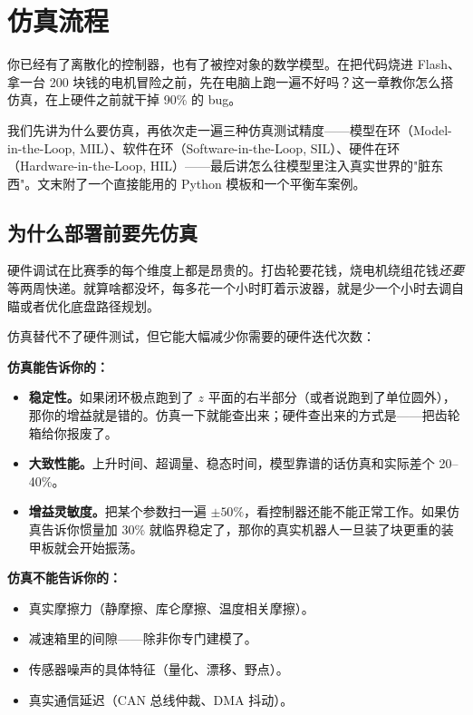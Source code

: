 \section{仿真流程}

你已经有了离散化的控制器，也有了被控对象的数学模型。在把代码烧进 Flash、拿一台 200 块钱的电机冒险之前，先在电脑上跑一遍不好吗？这一章教你怎么搭仿真，在上硬件之前就干掉 90\% 的 bug。

我们先讲为什么要仿真，再依次走一遍三种仿真测试精度——模型在环（Model-in-the-Loop, MIL）、软件在环（Software-in-the-Loop, SIL）、硬件在环（Hardware-in-the-Loop, HIL）——最后讲怎么往模型里注入真实世界的"脏东西"。文末附了一个直接能用的 Python 模板和一个平衡车案例。

\subsection{为什么部署前要先仿真}

硬件调试在比赛季的每个维度上都是昂贵的。打齿轮要花钱，烧电机绕组花钱\textit{还要}等两周快递。就算啥都没坏，每多花一个小时盯着示波器，就是少一个小时去调自瞄或者优化底盘路径规划。

仿真替代不了硬件测试，但它能大幅减少你需要的硬件迭代次数：

\textbf{仿真能告诉你的：}
\begin{itemize}
    \item \textbf{稳定性。}如果闭环极点跑到了 $z$ 平面的右半部分（或者说跑到了单位圆外），那你的增益就是错的。仿真一下就能查出来；硬件查出来的方式是——把齿轮箱给你报废了。
    \item \textbf{大致性能。}上升时间、超调量、稳态时间，模型靠谱的话仿真和实际差个 20--40\%。
    \item \textbf{增益灵敏度。}把某个参数扫一遍 $\pm 50\%$，看控制器还能不能正常工作。如果仿真告诉你惯量加 30\% 就临界稳定了，那你的真实机器人一旦装了块更重的装甲板就会开始振荡。
\end{itemize}

\textbf{仿真不能告诉你的：}
\begin{itemize}
    \item 真实摩擦力（静摩擦、库仑摩擦、温度相关摩擦）。
    \item 减速箱里的间隙——除非你专门建模了。
    \item 传感器噪声的具体特征（量化、漂移、野点）。
    \item 真实通信延迟（CAN 总线仲裁、DMA 抖动）。
\end{itemize}

